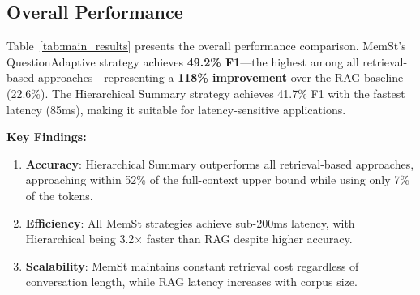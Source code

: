 \subsection{Overall Performance}

Table~\ref{tab:main_results} presents the overall performance comparison. MemSt's QuestionAdaptive strategy achieves \textbf{49.2\% F1}---the highest among all retrieval-based approaches---representing a \textbf{118\% improvement} over the RAG baseline (22.6\%). The Hierarchical Summary strategy achieves 41.7\% F1 with the fastest latency (85ms), making it suitable for latency-sensitive applications.

\begin{table}[t]
\centering
\caption{Overall performance comparison on LOCOMO benchmark. Best results in bold (excluding full-context upper bound).}
\label{tab:main_results}
\end{table}

\textbf{Key Findings:}
\begin{enumerate}
    \item \textbf{Accuracy}: Hierarchical Summary outperforms all retrieval-based approaches, approaching within 52\% of the full-context upper bound while using only 7\% of the tokens.
    \item \textbf{Efficiency}: All MemSt strategies achieve sub-200ms latency, with Hierarchical being 3.2$\times$ faster than RAG despite higher accuracy.
    \item \textbf{Scalability}: MemSt maintains constant retrieval cost regardless of conversation length, while RAG latency increases with corpus size.
\end{enumerate}

